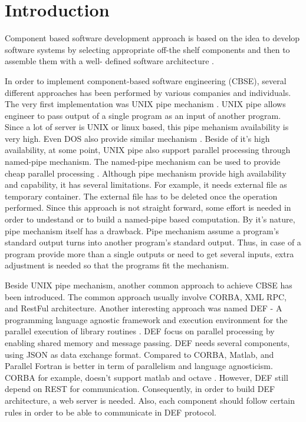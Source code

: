 \documentclass[conference]{IEEEtran}
\begin{document}
\section{Introduction}
Component based software development approach is based on
the idea to develop software systems by selecting appropriate
off-the shelf components and then to assemble them with a well-
defined software architecture \cite{kaur2010component}.

In order to implement component-based software engineering (CBSE), several different approaches has been performed by various companies and individuals. The very first implementation was UNIX pipe mechanism \cite{mcilroy1968mass}. UNIX pipe allows engineer to pass output of a single program as an input of another program. Since a lot of server is UNIX or linux based, this pipe mehanism availability is very high. Even DOS also provide similar mechanism \cite{dos7command}. Beside of it's high availability, at some point, UNIX pipe also support parallel processing through named-pipe mechanism. The named-pipe mechanism can be used to provide cheap parallel processing \cite{conway2003parallel}. Although pipe mechanism provide high availability and capability, it has several limitations. For example, it needs external file as temporary container. The external file has to be deleted once the operation performed. Since this approach is not straight forward, some effort is needed in order to undestand or to build a named-pipe based computation. By it's nature, pipe mechanism itself has a drawback. Pipe mechanism assume a program's standard output turns into another program's standard output. Thus, in case of a program provide more than a single outputs or need to get several inputs, extra adjustment is needed so that the programs fit the mechanism.

Beside UNIX pipe mechanism, another common approach to achieve CBSE has been introduced. The common approach usually involve CORBA, XML RPC, and RestFul architecture. Another interesting approach was named DEF - A programming language agnostic framework and execution environment for the parallel execution of library routines \cite{feilhauer2016def}. DEF focus on parallel processing by enabling shared memory and message passing. DEF needs several components, using JSON as data exchange format. Compared to CORBA, Matlab, and Parallel Fortran is better in term of parallelism and language agnosticism. CORBA for example, doesn't support matlab and octave \cite{feilhauer2016def}. However, DEF still depend on REST for communication. Consequently, in order to build DEF architecture, a web server is needed. Also, each component should follow certain rules in order to be able to communicate in DEF protocol.
\end{document}
